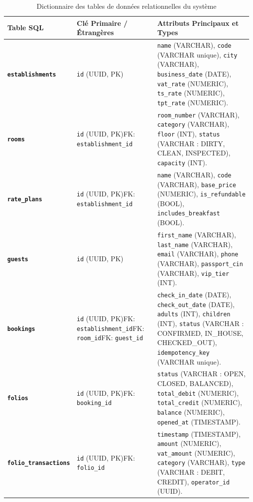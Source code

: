 \documentclass[12pt,a4paper,oneside]{report}
\begin{document}
\begin{table}[H]
\centering
\scriptsize
\renewcommand{\arraystretch}{1.25}
\begin{tabularx}{\textwidth}{|p{3.2cm}|p{3cm}|X|}
\hline
\textbf{Table SQL} & \textbf{Clé Primaire / Étrangères} & \textbf{Attributs Principaux et Types} \\
\hline
\textbf{\texttt{establishments}} & \texttt{id} (UUID, PK) & \texttt{name} (VARCHAR), \texttt{code} (VARCHAR unique), \texttt{city} (VARCHAR), \texttt{business\_date} (DATE), \texttt{vat\_rate} (NUMERIC), \texttt{ts\_rate} (NUMERIC), \texttt{tpt\_rate} (NUMERIC). \\
\hline
\textbf{\texttt{rooms}} & \texttt{id} (UUID, PK)\newline FK: \texttt{establishment\_id} & \texttt{room\_number} (VARCHAR), \texttt{category} (VARCHAR), \texttt{floor} (INT), \texttt{status} (VARCHAR : DIRTY, CLEAN, INSPECTED), \texttt{capacity} (INT). \\
\hline
\textbf{\texttt{rate\_plans}} & \texttt{id} (UUID, PK)\newline FK: \texttt{establishment\_id} & \texttt{name} (VARCHAR), \texttt{code} (VARCHAR), \texttt{base\_price} (NUMERIC), \texttt{is\_refundable} (BOOL), \texttt{includes\_breakfast} (BOOL). \\
\hline
\textbf{\texttt{guests}} & \texttt{id} (UUID, PK) & \texttt{first\_name} (VARCHAR), \texttt{last\_name} (VARCHAR), \texttt{email} (VARCHAR), \texttt{phone} (VARCHAR), \texttt{passport\_cin} (VARCHAR), \texttt{vip\_tier} (INT). \\
\hline
\textbf{\texttt{bookings}} & \texttt{id} (UUID, PK)\newline FK: \texttt{establishment\_id}\newline FK: \texttt{room\_id}\newline FK: \texttt{guest\_id} & \texttt{check\_in\_date} (DATE), \texttt{check\_out\_date} (DATE), \texttt{adults} (INT), \texttt{children} (INT), \texttt{status} (VARCHAR : CONFIRMED, IN\_HOUSE, CHECKED\_OUT), \texttt{idempotency\_key} (VARCHAR unique). \\
\hline
\textbf{\texttt{folios}} & \texttt{id} (UUID, PK)\newline FK: \texttt{booking\_id} & \texttt{status} (VARCHAR : OPEN, CLOSED, BALANCED), \texttt{total\_debit} (NUMERIC), \texttt{total\_credit} (NUMERIC), \texttt{balance} (NUMERIC), \texttt{opened\_at} (TIMESTAMP). \\
\hline
\textbf{\texttt{folio\_transactions}} & \texttt{id} (UUID, PK)\newline FK: \texttt{folio\_id} & \texttt{timestamp} (TIMESTAMP), \texttt{amount} (NUMERIC), \texttt{vat\_amount} (NUMERIC), \texttt{category} (VARCHAR), \texttt{type} (VARCHAR : DEBIT, CREDIT), \texttt{operator\_id} (UUID). \\
\hline
\end{tabularx}
\caption{Dictionnaire des tables de données relationnelles du système}
\label{tab:annexe_tables}
\end{table}
\end{document}
